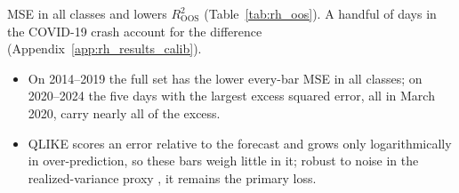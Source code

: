 \begin{itemize}
  MSE in all \rhorAfPairs{} classes and lowers $R^2_{\mathrm{OOS}}$ (Table~\ref{tab:rh_oos}). A handful of days in the
  COVID-19 crash account for the difference (Appendix~\ref{app:rh_results_calib}).
  \begin{itemize}
  \item On 2014--2019 the full set has the lower every-bar MSE in all classes; on 2020--2024 the five days with the
    largest excess squared error, all in March 2020, carry nearly all of the excess.
  \item QLIKE scores an error relative to the forecast and grows only logarithmically in over-prediction, so these
    bars weigh little in it; robust to noise in the realized-variance proxy \citep{Patton2011}, it remains the
    primary loss.
  \end{itemize}
\end{itemize}

